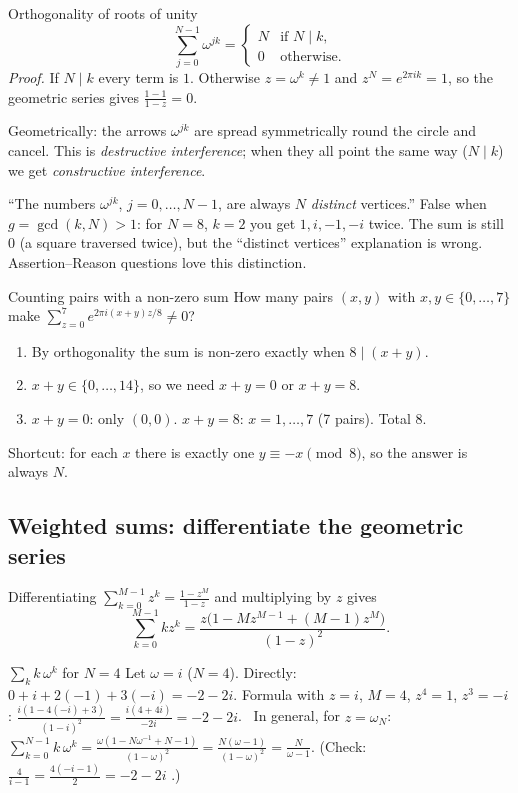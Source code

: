 \documentclass[11pt,a4paper,openany]{book}
\newcounter{wex}[chapter]
\newenvironment{steps}{\begin{enumerate}[label=\textbf{Step \arabic*.}, leftmargin=4.2em, itemsep=2pt]}{\end{enumerate}}
\begin{document}
\begin{keyres}{Orthogonality of roots of unity}
\[ \sum_{j=0}^{N-1}\omega^{jk} = \begin{cases} N & \text{if } N \mid k,\\ 0 & \text{otherwise.}\end{cases} \]
\emph{Proof.} If $N \mid k$ every term is $1$. Otherwise $z = \omega^k \neq 1$ and $z^N = e^{2\pi i k} = 1$, so the geometric series
gives $\frac{1 - 1}{1 - z} = 0$.
\end{keyres}
Geometrically: the arrows $\omega^{jk}$ are spread symmetrically round the circle and cancel. This is \emph{destructive
interference}; when they all point the same way ($N \mid k$) we get \emph{constructive interference}.

\begin{trap}
``The numbers $\omega^{jk}$, $j = 0, \dots, N-1$, are always $N$ \emph{distinct} vertices.'' False when $g = \gcd(k, N) > 1$: for
$N = 8$, $k = 2$ you get $1, i, -1, -i$ twice. The sum is still $0$ (a square traversed twice), but the ``distinct
vertices'' explanation is wrong. Assertion--Reason questions love this distinction.
\end{trap}

\begin{wexample}{Counting pairs with a non-zero sum}
How many pairs $(x, y)$ with $x, y \in \{0, \dots, 7\}$ make $\sum_{z=0}^{7} e^{2\pi i (x+y) z/8} \neq 0$?
\begin{steps}
\item By orthogonality the sum is non-zero exactly when $8 \mid (x + y)$.
\item $x + y \in \{0, \dots, 14\}$, so we need $x + y = 0$ or $x + y = 8$.
\item $x + y = 0$: only $(0,0)$. $x + y = 8$: $x = 1, \dots, 7$ (7 pairs). Total $8$.
\end{steps}
Shortcut: for each $x$ there is exactly one $y \equiv -x \pmod 8$, so the answer is always $N$.
\end{wexample}

\subsection{Weighted sums: differentiate the geometric series}
Differentiating $\sum_{k=0}^{M-1} z^k = \frac{1 - z^M}{1 - z}$ and multiplying by $z$ gives
\[ \sum_{k=0}^{M-1} k z^k = \frac{z\big(1 - M z^{M-1} + (M-1) z^M\big)}{(1 - z)^2}. \]
\begin{wexample}{$\sum_k k\,\omega^k$ for $N = 4$}
Let $\omega = i$ ($N = 4$). Directly: $0 + i + 2(-1) + 3(-i) = -2 - 2i$. Formula with $z = i$, $M = 4$, $z^4 = 1$, $z^3 = -i$:
$\frac{i(1 - 4(-i) + 3)}{(1-i)^2} = \frac{i(4 + 4i)}{-2i} = -2 - 2i$. \checkmark\ In general, for $z = \omega_N$:
$\sum_{k=0}^{N-1} k\,\omega^k = \frac{\omega(1 - N\omega^{-1} + N - 1)}{(1-\omega)^2} = \frac{N(\omega - 1)}{(1-\omega)^2} = \frac{N}{\omega - 1}$.
(Check: $\frac{4}{i - 1} = \frac{4(-i-1)}{2} = -2 - 2i$ \checkmark.)
\end{wexample}
\end{document}
